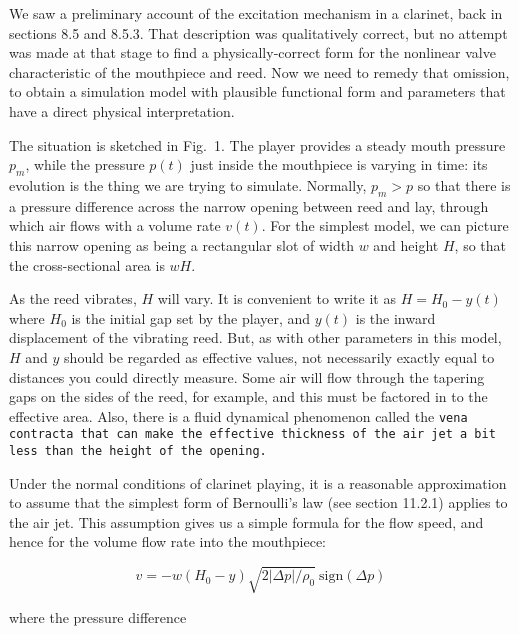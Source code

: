   We saw a preliminary account of the excitation mechanism in a clarinet, back 
  in sections 8.5 and 8.5.3. That description was qualitatively correct, but no 
  attempt was made at that stage to find a physically-correct form for the 
  nonlinear valve characteristic of the mouthpiece and reed. Now we need to 
  remedy that omission, to obtain a simulation model with plausible functional 
  form and parameters that have a direct physical interpretation. 

  The situation is sketched in Fig.\ 1. The player provides a steady mouth 
  pressure $p_m$, while the pressure $p(t)$ just inside the mouthpiece is 
  varying in time: its evolution is the thing we are trying to simulate. 
  Normally, $p_m > p$ so that there is a pressure difference across the narrow 
  opening between reed and lay, through which air flows with a volume rate 
  $v(t)$. For the simplest model, we can picture this narrow opening as being a 
  rectangular slot of width $w$ and height $H$, so that the cross-sectional 
  area is $wH$. 


  As the reed vibrates, $H$ will vary. It is convenient to write it as 
  $H=H_0-y(t)$ where $H_0$ is the initial gap set by the player, and $y(t)$ is 
  the inward displacement of the vibrating reed. But, as with other parameters 
  in this model, $H$ and $y$ should be regarded as effective values, not 
  necessarily exactly equal to distances you could directly measure. Some air 
  will flow through the tapering gaps on the sides of the reed, for example, 
  and this must be factored in to the effective area. Also, there is a fluid 
  dynamical phenomenon called the \tt{}vena contracta\rm{} that can make the 
  effective thickness of the air jet a bit less than the height of the opening. 

  Under the normal conditions of clarinet playing, it is a reasonable 
  approximation to assume that the simplest form of Bernoulli's law (see 
  section 11.2.1) applies to the air jet. This assumption gives us a simple 
  formula for the flow speed, and hence for the volume flow rate into the 
  mouthpiece: 

  \begin{equation*}v=-w(H_0-y) \sqrt{2 |\Delta p|/\rho_0} \mathrm{~sign} 
  (\Delta p) \tag{1}\end{equation*} 

  \noindent{}where the pressure difference 

